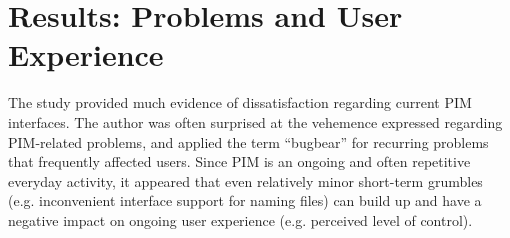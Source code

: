 \newpage
\section{Results: Problems and User Experience}
\label{exp-study:comparison-problems}
The study provided much evidence of dissatisfaction regarding current PIM interfaces.  
The author was often surprised at the vehemence expressed regarding PIM-related problems, and applied the term ``bugbear'' for recurring problems that frequently affected users.  Since PIM is an ongoing and often repetitive everyday activity, it appeared that even relatively minor short-term grumbles (e.g. inconvenient interface support for naming files) can build up and have a negative impact on ongoing user experience (e.g. perceived level of control).  

